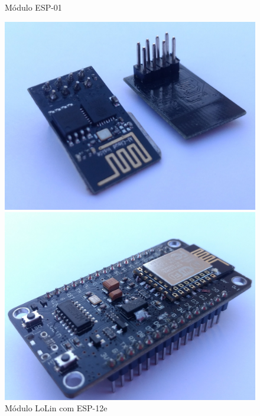 \begin{figure}[htb]
	\centering
	\begin{minipage}{0.49\textwidth}
		\centering
		\caption{Módulo ESP-01 \label{fig:esp-01}}
		\includegraphics[width=1\textwidth]{041-esp8266/img/esp-01.jpg}
	\end{minipage}
	\hfill
	\begin{minipage}{0.49\textwidth}
		\centering
		\caption{Módulo LoLin com ESP-12e \label{fig:lolin}}
		\includegraphics[width=1\textwidth]{041-esp8266/img/esp-12e-lolin.jpg}
	\end{minipage}
\end{figure}

